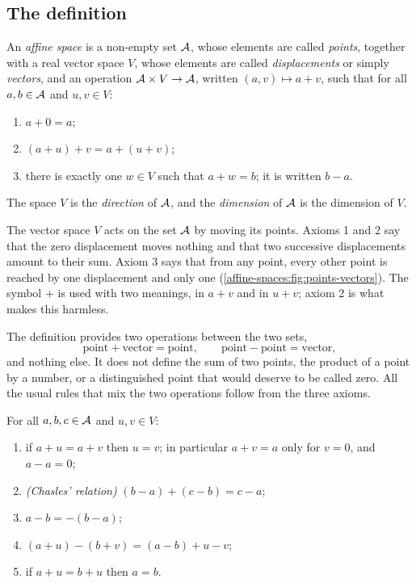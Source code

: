 \begin{notechapter}
\section{The definition}\label{affine-spaces:sec:definition}

\begin{definition}\label{affine-spaces:def:affine}
An \emph{affine space} is a non-empty set $\mathcal{A}$, whose elements are called
\emph{points}, together with a real vector space $V$, whose elements are
called \emph{displacements} or simply \emph{vectors}, and an operation
$\mathcal{A}\times V\to\mathcal{A}$, written $(a, v)\mapsto a + v$, such that for all
$a, b\in\mathcal{A}$ and $u, v\in V$:
\begin{enumerate}[nosep]
  \item $a + 0 = a$;
  \item $(a + u) + v = a + (u + v)$;
  \item there is exactly one $w\in V$ such that $a + w = b$; it is
        written $b - a$.
\end{enumerate}
The space $V$ is the \emph{direction} of $\mathcal{A}$, and the \emph{dimension} of
$\mathcal{A}$ is the dimension of $V$.
\end{definition}

\begin{intuition}
The vector space $V$ acts on the set $\mathcal{A}$ by moving its points. Axioms 1
and 2 say that the zero displacement moves nothing and that two successive
displacements amount to their sum. Axiom 3 says that from any point, every
other point is reached by one displacement and only one
(\cref{affine-spaces:fig:points-vectors}). The symbol $+$ is
used with two meanings, in $a + v$ and in $u + v$; axiom 2 is what makes
this harmless.
\end{intuition}

The definition provides two operations between the two sets,
\[
  \text{point} + \text{vector} = \text{point},
  \qquad
  \text{point} - \text{point} = \text{vector},
\]
and nothing else. It does not define the sum of two points, the product of
a point by a number, or a distinguished point that would deserve to be
called zero. All the usual rules that mix the two operations follow from
the three axioms.

\begin{proposition}\label{affine-spaces:prop:rules}
For all $a, b, c\in\mathcal{A}$ and $u, v\in V$:
\begin{enumerate}[nosep]
  \item if $a + u = a + v$ then $u = v$; in particular $a + v = a$ only for
        $v = 0$, and $a - a = 0$;
  \item \emph{(Chasles' relation)} $(b - a) + (c - b) = c - a$;
  \item $a - b = -(b - a)$;
  \item $(a + u) - (b + v) = (a - b) + u - v$;
  \item if $a + u = b + u$ then $a = b$.
\end{enumerate}
\end{proposition}


\end{notechapter}
